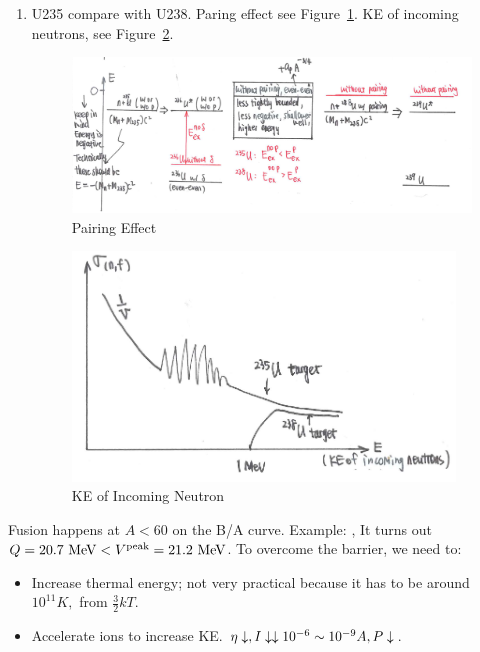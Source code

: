 \documentclass{school-22.101-notes}
\begin{document}
\begin{enumerate}
\item U235 compare with U238.
Paring effect see Figure~\ref{pairing-effect}. KE of incoming neutrons, see Figure~\ref{KE-incoming-neutron}. 
\begin{figure}
   \centering
   \includegraphics[width=6in]{images/ni/pairing-effect.png}
   \caption{Pairing Effect\label{pairing-effect}}
\end{figure}
\begin{figure}
   \centering
   \includegraphics[width=4in]{images/ni/KE-incoming-neutron.png}
   \caption{KE of Incoming Neutron\label{KE-incoming-neutron}}
\end{figure}
\end{enumerate}

Fusion happens at $A<60$ on the B/A curve. Example: , It turns out $Q = 20.7 \mbox{ } \mathrm{MeV} < V^{\mathrm{peak}} = 21.2 \mbox{ } \mathrm{MeV}$. To overcome the barrier, we need to:
\begin{itemize}
\item Increase thermal energy; not very practical because it has to be around $10^{11} K,$ from $\frac{3}{2} kT$. 
\item Accelerate ions to increase KE. $\eta \downarrow, I \downarrow \downarrow 10^{-6} \sim 10^{-9} A, P \downarrow$.
\end{itemize}
\end{document}
